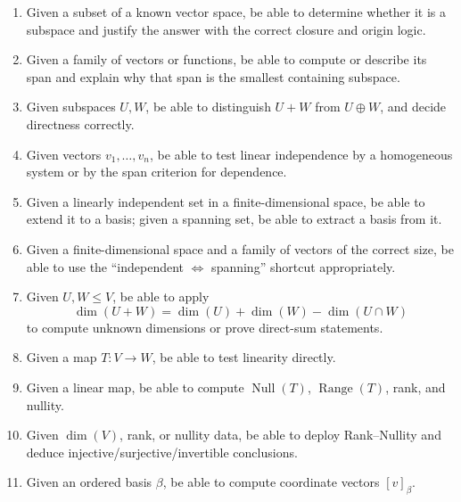 \begin{examtip}[title={Final Revision Checklist: ``Given \(\cdots\), be able to \(\cdots\)''}]
\begin{enumerate}[leftmargin=*]
    \item Given a subset of a known vector space, be able to determine whether it is a subspace and justify the answer with the correct closure and origin logic.

    \item Given a family of vectors or functions, be able to compute or describe its span and explain why that span is the smallest containing subspace.

    \item Given subspaces \(U,W\), be able to distinguish \(U+W\) from \(U\oplus W\), and decide directness correctly.

    \item Given vectors \(v_1,\dots,v_n\), be able to test linear independence by a homogeneous system or by the span criterion for dependence.

    \item Given a linearly independent set in a finite-dimensional space, be able to extend it to a basis; given a spanning set, be able to extract a basis from it.

    \item Given a finite-dimensional space and a family of vectors of the correct size, be able to use the ``independent \(\Leftrightarrow\) spanning'' shortcut appropriately.

    \item Given \(U,W\le V\), be able to apply
    \[
    \dim(U+W)=\dim(U)+\dim(W)-\dim(U\cap W)
    \]
    to compute unknown dimensions or prove direct-sum statements.

    \item Given a map \(T:V\to W\), be able to test linearity directly.

    \item Given a linear map, be able to compute \(\operatorname{Null}(T)\), \(\operatorname{Range}(T)\), rank, and nullity.

    \item Given \(\dim(V)\), rank, or nullity data, be able to deploy Rank--Nullity and deduce injective/surjective/invertible conclusions.

    \item Given an ordered basis \(\beta\), be able to compute coordinate vectors \([v]_\beta\).


\end{enumerate}
\end{examtip}
